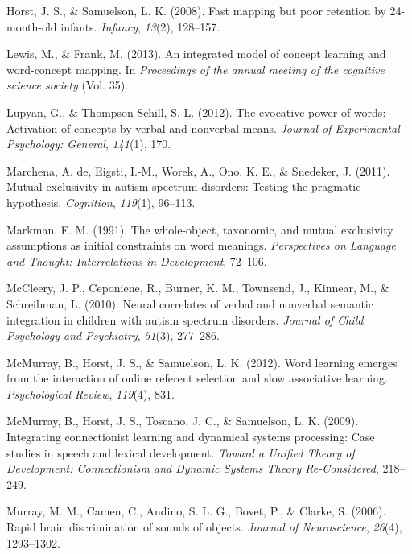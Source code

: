 \documentclass[english,floatsintext,man]{apa6}
\theoremstyle{definition}
\theoremstyle{definition}
\theoremstyle{definition}
\theoremstyle{remark}
\begin{document}
\leavevmode\hypertarget{ref-horst2008fast}{}%
Horst, J. S., \& Samuelson, L. K. (2008). Fast mapping but poor
retention by 24-month-old infants. \emph{Infancy}, \emph{13}(2),
128--157.

\leavevmode\hypertarget{ref-lewis2013integrated}{}%
Lewis, M., \& Frank, M. (2013). An integrated model of concept learning
and word-concept mapping. In \emph{Proceedings of the annual meeting of
the cognitive science society} (Vol. 35).

\leavevmode\hypertarget{ref-lupyan2012evocative}{}%
Lupyan, G., \& Thompson-Schill, S. L. (2012). The evocative power of
words: Activation of concepts by verbal and nonverbal means.
\emph{Journal of Experimental Psychology: General}, \emph{141}(1), 170.

\leavevmode\hypertarget{ref-de2011mutual}{}%
Marchena, A. de, Eigsti, I.-M., Worek, A., Ono, K. E., \& Snedeker, J.
(2011). Mutual exclusivity in autism spectrum disorders: Testing the
pragmatic hypothesis. \emph{Cognition}, \emph{119}(1), 96--113.

\leavevmode\hypertarget{ref-markman1991whole}{}%
Markman, E. M. (1991). The whole-object, taxonomic, and mutual
exclusivity assumptions as initial constraints on word meanings.
\emph{Perspectives on Language and Thought: Interrelations in
Development}, 72--106.

\leavevmode\hypertarget{ref-mccleery2010neural}{}%
McCleery, J. P., Ceponiene, R., Burner, K. M., Townsend, J., Kinnear,
M., \& Schreibman, L. (2010). Neural correlates of verbal and nonverbal
semantic integration in children with autism spectrum disorders.
\emph{Journal of Child Psychology and Psychiatry}, \emph{51}(3),
277--286.

\leavevmode\hypertarget{ref-mcmurray2012word}{}%
McMurray, B., Horst, J. S., \& Samuelson, L. K. (2012). Word learning
emerges from the interaction of online referent selection and slow
associative learning. \emph{Psychological Review}, \emph{119}(4), 831.

\leavevmode\hypertarget{ref-mcmurray2009integrating}{}%
McMurray, B., Horst, J. S., Toscano, J. C., \& Samuelson, L. K. (2009).
Integrating connectionist learning and dynamical systems processing:
Case studies in speech and lexical development. \emph{Toward a Unified
Theory of Development: Connectionism and Dynamic Systems Theory
Re-Considered}, 218--249.

\leavevmode\hypertarget{ref-murray2006rapid}{}%
Murray, M. M., Camen, C., Andino, S. L. G., Bovet, P., \& Clarke, S.
(2006). Rapid brain discrimination of sounds of objects. \emph{Journal
of Neuroscience}, \emph{26}(4), 1293--1302.
\end{document}

